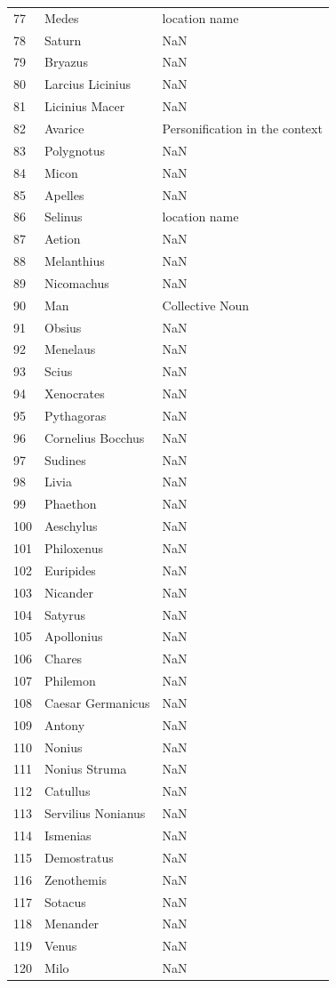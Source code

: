 \documentclass[
  12pt,
]{article}
\begin{document}
\begin{longtable}[]{@{}lll@{}}
77 & Medes & location name \\
78 & Saturn & NaN \\
79 & Bryazus & NaN \\
80 & Larcius Licinius & NaN \\
81 & Licinius Macer & NaN \\
82 & Avarice & Personification in the context \\
83 & Polygnotus & NaN \\
84 & Micon & NaN \\
85 & Apelles & NaN \\
86 & Selinus & location name \\
87 & Aetion & NaN \\
88 & Melanthius & NaN \\
89 & Nicomachus & NaN \\
90 & Man & Collective Noun \\
91 & Obsius & NaN \\
92 & Menelaus & NaN \\
93 & Scius & NaN \\
94 & Xenocrates & NaN \\
95 & Pythagoras & NaN \\
96 & Cornelius Bocchus & NaN \\
97 & Sudines & NaN \\
98 & Livia & NaN \\
99 & Phaethon & NaN \\
100 & Aeschylus & NaN \\
101 & Philoxenus & NaN \\
102 & Euripides & NaN \\
103 & Nicander & NaN \\
104 & Satyrus & NaN \\
105 & Apollonius & NaN \\
106 & Chares & NaN \\
107 & Philemon & NaN \\
108 & Caesar Germanicus & NaN \\
109 & Antony & NaN \\
110 & Nonius & NaN \\
111 & Nonius Struma & NaN \\
112 & Catullus & NaN \\
113 & Servilius Nonianus & NaN \\
114 & Ismenias & NaN \\
115 & Demostratus & NaN \\
116 & Zenothemis & NaN \\
117 & Sotacus & NaN \\
118 & Menander & NaN \\
119 & Venus & NaN \\
120 & Milo & NaN \\
\end{longtable}
\end{document}
